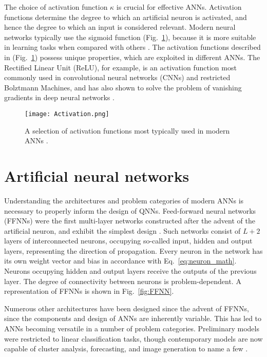 \documentclass[twocolumn,superscriptaddress]{revtex4-1}
\begin{document}
The choice of activation function $\kappa$ is crucial for effective ANNs. Activation functions determine the degree to which an artificial neuron is activated, and hence the degree to which an input is considered relevant. Modern neural networks typically use the sigmoid function (Fig.~\ref{fig:Activation}), because it is more suitable in learning tasks when compared with others \cite{nielsenneural}. The activation functions described in (Fig.~\ref{fig:Activation}) possess unique properties, which are exploited in different ANNs. The Rectified Linear Unit (ReLU), for example, is an activation function most commonly used in convolutional neural networks (CNNs) and restricted Bolztmann Machines, and has also shown to solve the problem of vanishing gradients in deep neural networks \cite{7966185}.

\begin{figure}[t!]
\texttt{[image: Activation.png]}
\caption{A selection of activation functions most typically used in modern ANNs \cite{Beer:2022wgv}.}
\label{fig:Activation}
\end{figure}

\section{Artificial neural networks} \label{networks}

Understanding the architectures and problem categories of modern ANNs is necessary to properly inform the design of QNNs. Feed-forward neural networks (FFNNs) were the first multi-layer networks constructed after the advent of the artificial neuron, and exhibit the simplest design \cite{Beer:2022wgv}. Such networks consist of $L + 2$ layers of interconnected neurons, occupying so-called input, hidden and output layers, representing the direction of propagation. Every neuron in the network has its own weight vector and bias in accordance with Eq.~\ref{eq:neuron_math}. Neurons occupying hidden and output layers receive the outputs of the previous layer. The degree of connectivity between neurons is problem-dependent. A representation of FFNNs is shown in Fig.~\ref{fig:FFNN}.

Numerous other architectures have been designed since the advent of FFNNs, since the components and design of ANNs are inherently variable. This has led to ANNs becoming versatile in a number of problem categories. Preliminary models were restricted to linear classification tasks, though contemporary models are now capable of cluster analysis, forecasting, and image generation to name a few \cite{Basheer2001}.
\end{document}
